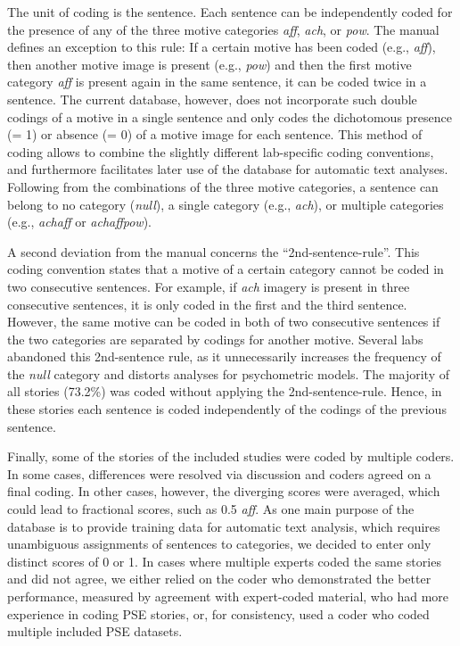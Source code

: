 \documentclass[man,a4paper,mask]{apa6}\usepackage[]{graphicx}\usepackage[]{color}
\begin{document}
The unit of coding is the sentence. Each sentence can be independently coded for the presence of any of the three motive categories \emph{aff}, \emph{ach}, or \emph{pow}. The manual defines an exception to this rule: If a certain motive has been coded (e.g., \emph{aff}), then another motive image is present (e.g., \emph{pow}) and then the first motive category \emph{aff} is present again in the same sentence, it can be coded twice in a sentence. The current database, however, does not incorporate such double codings of a motive in a single sentence and only codes the dichotomous presence (= 1) or absence (= 0) of a motive image for each sentence. This method of coding allows to combine the slightly different lab-specific coding conventions, and furthermore facilitates later use of the database for automatic text analyses.
Following from the combinations of the three motive categories, a sentence can belong to no category (\emph{null}), a single category (e.g., \emph{ach}), or multiple categories (e.g., \emph{achaff} or \emph{achaffpow}).

A second deviation from the manual concerns the ``2nd-sentence-rule''. This coding convention states that a motive of a certain category cannot be coded in two consecutive sentences. For example, if \emph{ach} imagery is present in three consecutive sentences, it is only coded in the first and the third sentence. However, the same motive can be coded in both of two consecutive sentences if the two categories are separated by codings for another motive. Several labs abandoned this 2nd-sentence rule, as it unnecessarily increases the frequency of the \emph{null} category and distorts analyses for psychometric models. The majority of all stories (73.2\%) was coded without applying the 2nd-sentence-rule. Hence, in these stories each sentence is coded independently of the codings of the previous sentence.

Finally, some of the stories of the included studies were coded by multiple coders. In some cases, differences were resolved via discussion and coders agreed on a final coding. In other cases, however, the diverging scores were averaged, which could lead to fractional scores, such as 0.5 \emph{aff}. As one main purpose of the database is to provide training data for automatic text analysis, which requires unambiguous assignments of sentences to categories, we decided to enter only distinct scores of 0 or 1. In cases where multiple experts coded the same stories and did not agree, we either relied on the coder who demonstrated the better performance, measured by agreement with expert-coded material, who had more experience in coding PSE stories, or, for consistency, used a coder who coded multiple included PSE datasets.
\end{document}
